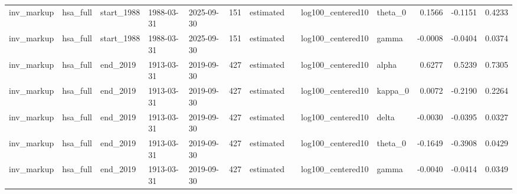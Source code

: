 \begin{tabular}{lllllrllllrrr}
inv\_markup & hsa\_full & start\_1988 & 1988-03-31 & 2025-09-30 & 151 & estimated &  & log100\_centered10 & theta\_0 & 0.1566 & -0.1151 & 0.4233 \\
inv\_markup & hsa\_full & start\_1988 & 1988-03-31 & 2025-09-30 & 151 & estimated &  & log100\_centered10 & gamma & -0.0008 & -0.0404 & 0.0374 \\
inv\_markup & hsa\_full & end\_2019 & 1913-03-31 & 2019-09-30 & 427 & estimated &  & log100\_centered10 & alpha & 0.6277 & 0.5239 & 0.7305 \\
inv\_markup & hsa\_full & end\_2019 & 1913-03-31 & 2019-09-30 & 427 & estimated &  & log100\_centered10 & kappa\_0 & 0.0072 & -0.2190 & 0.2264 \\
inv\_markup & hsa\_full & end\_2019 & 1913-03-31 & 2019-09-30 & 427 & estimated &  & log100\_centered10 & delta & -0.0030 & -0.0395 & 0.0327 \\
inv\_markup & hsa\_full & end\_2019 & 1913-03-31 & 2019-09-30 & 427 & estimated &  & log100\_centered10 & theta\_0 & -0.1649 & -0.3908 & 0.0429 \\
inv\_markup & hsa\_full & end\_2019 & 1913-03-31 & 2019-09-30 & 427 & estimated &  & log100\_centered10 & gamma & -0.0040 & -0.0414 & 0.0349 \\
\bottomrule
\end{tabular}

